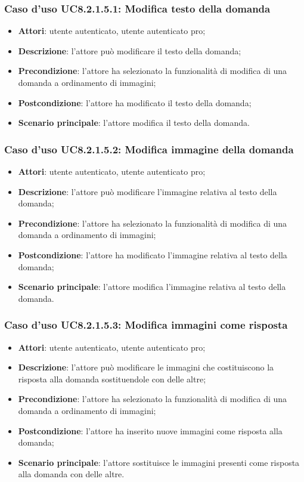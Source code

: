 \subsubsection{Caso d'uso UC8.2.1.5.1: Modifica testo della domanda}
\begin{itemize}
	\item\textbf{Attori}: utente autenticato, utente autenticato pro;
	\item \textbf{Descrizione}: l'attore può modificare il testo della domanda;
		\item
			\textbf{Precondizione}: l'attore ha selezionato la funzionalità di modifica di una domanda a ordinamento di immagini; 
		\item
			\textbf{Postcondizione}: l'attore ha modificato il testo della domanda;
		\item
			\textbf{Scenario principale}: l'attore modifica il testo della domanda.	
	\end{itemize}

\subsubsection{Caso d'uso UC8.2.1.5.2: Modifica immagine della domanda}
\begin{itemize}
	\item\textbf{Attori}: utente autenticato, utente autenticato pro;
	\item \textbf{Descrizione}: l'attore può modificare l'immagine relativa al testo della domanda;
		\item
			\textbf{Precondizione}: l'attore ha selezionato la funzionalità di modifica di una domanda a ordinamento di immagini; 
		\item
			\textbf{Postcondizione}: l'attore ha modificato l'immagine relativa al testo della domanda;
		\item
			\textbf{Scenario principale}: l'attore modifica l'immagine relativa al testo della domanda. 	
	\end{itemize}

\subsubsection{Caso d'uso UC8.2.1.5.3: Modifica immagini come risposta}
\begin{itemize}
	\item\textbf{Attori}: utente autenticato, utente autenticato pro;
	\item\textbf{Descrizione}: l'attore può modificare le immagini che costituiscono la risposta alla domanda sostituendole con delle altre;
	\item\textbf{Precondizione}: l'attore ha selezionato la funzionalità di modifica di una domanda a ordinamento di immagini;
	\item \textbf{Postcondizione}: l'attore ha inserito nuove immagini come risposta alla domanda;
	\item\textbf{Scenario principale}: l'attore sostituisce le immagini presenti come risposta alla domanda con delle altre.
\end{itemize}

